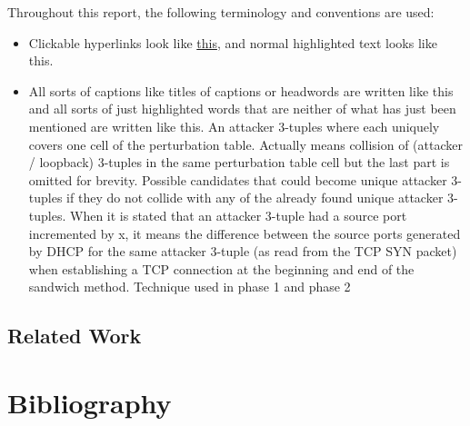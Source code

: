 \documentclass{report}
\begin{document}
Throughout this report, the following terminology and conventions are used:
\begin{itemize}
	\item Clickable hyperlinks look like \hyperref[sec:terminology and conventions]{this}, and normal highlighted text looks like \alert{this}.
  \item All sorts of captions like titles of captions or headwords are written like this  and all sorts of just highlighted words that are neither of what has just been mentioned are written like \alert{this}.
	 An attacker 3-tuples where each uniquely covers one cell of the perturbation table.
	 Actually means collision of (attacker / loopback) 3-tuples in the same perturbation table cell but the last part is omitted for brevity.
	 Possible candidates that could become unique attacker 3-tuples if they do not collide with any of the already found unique attacker 3-tuples.
	 When it is stated that an attacker 3-tuple had a source port incremented by x, it means the difference between the source ports generated by DHCP for the same attacker 3-tuple (as read from the TCP SYN packet) when establishing a TCP connection at the beginning and end of the sandwich method.
	 Technique used in phase 1 and phase 2 
\end{itemize}

\section{Related Work}
\label{sec:related work}

\vspace{0.5cm}
\chapter{Bibliography}
\label{sec:bibliography}

\printbibliography[heading=none]
\end{document}
